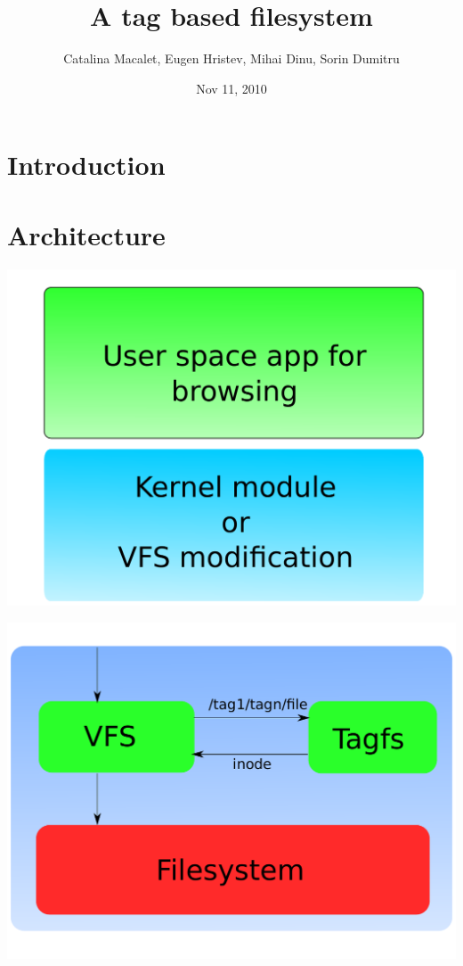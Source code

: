 \documentclass{beamer}
\title[TagFS]{A tag based filesystem}
\author{Catalina Macalet, Eugen Hristev, Mihai Dinu, Sorin Dumitru}
\institute{Politehnic University of Bucharest}
\date{Nov 11, 2010}
\begin{document}

\begin{frame}
  \titlepage
\end{frame}

\section{Introduction}

\begin{frame}
\end{frame}

\section{Architecture}

\begin{frame}
  \includegraphics[scale=0.6]{art/archall.pdf}
\end{frame}

\begin{frame}
  \includegraphics[scale=0.6]{art/archdetail.pdf}
\end{frame}
\end{document}
